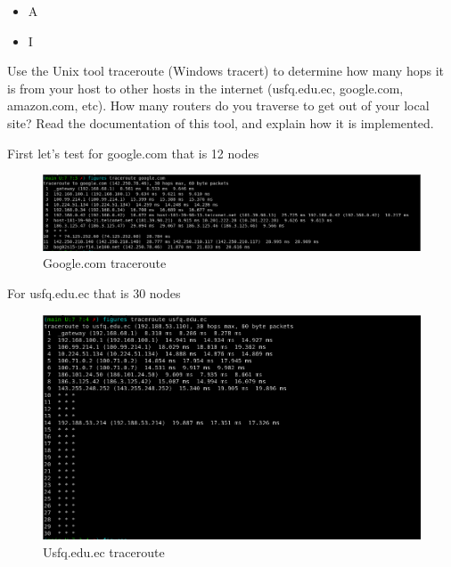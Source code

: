 \documentclass{assignment}
\begin{document}
\begin{itemize}
  \item A
  \item I
\end{itemize} 
\newpage
\begin{ex}
Use the Unix tool traceroute (Windows tracert) to determine how many hops it is from your
host to other hosts in the internet (usfq.edu.ec, google.com, amazon.com, etc). How many
routers do you traverse to get out of your local site? Read the documentation of this tool, and
explain how it is implemented. 
\end{ex}

First let's test for google.com that is 12 nodes
\begin{figure}[h]
\begin{center}
  \includegraphics[scale=0.3]{figures/2_001.png}
\end{center}
\caption{Google.com traceroute}
\end{figure}

For usfq.edu.ec that is 30 nodes
\begin{figure}[h]
\begin{center}
  \includegraphics[scale=0.3]{figures/2_002.png}
\end{center}
\caption{Usfq.edu.ec traceroute}
\end{figure}
\end{document}
